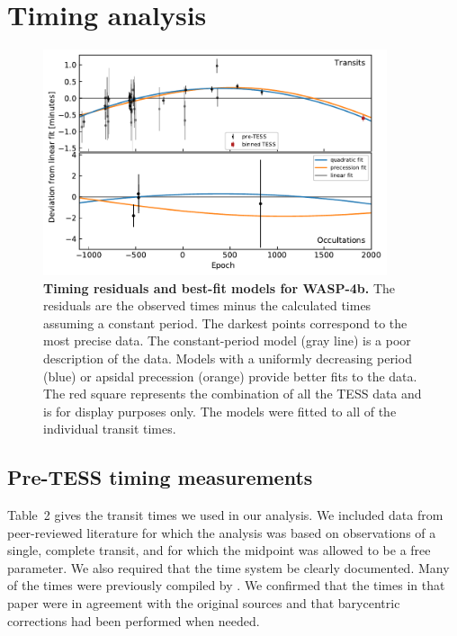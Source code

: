 \documentclass[12pt,twocolumn,tighten]{aastex62}
\begin{document}
\section{Timing analysis}
\label{sec:timing}

\begin{figure}[t!]
	\begin{center}
		\leavevmode
		\includegraphics[width=0.9\textwidth]{f4.pdf}
	\end{center}
	\vspace{-0.5cm}
	\caption{ {\bf Timing residuals and best-fit models for WASP-4b.}
		The residuals are the observed times minus the calculated times
		assuming a constant period.  The darkest points correspond to
		the most precise data. The constant-period model (gray line) is
		a poor description of the data.  Models with a uniformly
		decreasing period (blue) or apsidal precession (orange) provide
		better fits to the data.  The red square represents the
		combination of all the TESS data and is for display purposes
		only.  The models were fitted to all of the individual transit
		times.
		\label{fig:times}
	}
\end{figure}

\subsection{Pre-TESS timing measurements}
\label{subsec:times}

Table~2 gives the transit times we used in our analysis. We included
data from peer-reviewed literature for which the analysis was based on
observations of a single, complete transit, and for which the midpoint
was allowed to be a free parameter. We also required that the time
system be clearly documented. Many of the times were previously
compiled by \citet{hoyer_tramos_2013}. We confirmed that the times in
that paper were in agreement with the original sources and that
barycentric corrections had been performed when needed.
\end{document}
